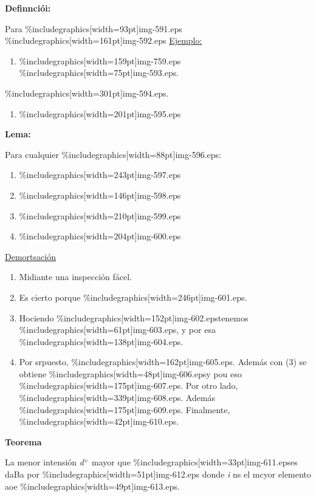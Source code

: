 \documentclass[12pt]{article}
\begin{document}
\textbf{Definnci\'{o}i:}

Para \%includegraphics[width=93pt]{img-591.eps}
\%includegraphics[width=161pt]{img-592.eps}
\uline{Ejemplo:}

\begin{enumerate}
	\item \%includegraphics[width=159pt]{img-759.eps}
\%includegraphics[width=75pt]{img-593.eps}.
\end{enumerate}

\%includegraphics[width=301pt]{img-594.eps}.

\begin{enumerate}
	\item \%includegraphics[width=201pt]{img-595.eps}\end{enumerate}

\textbf{Lema:}

Para cualquier \%includegraphics[width=88pt]{img-596.eps}:

\begin{enumerate}
	\item \%includegraphics[width=243pt]{img-597.eps}	\item \%includegraphics[width=146pt]{img-598.eps}	\item \%includegraphics[width=210pt]{img-599.eps}	\item \%includegraphics[width=204pt]{img-600.eps}\end{enumerate}

\uline{Demortsaci\'{o}n}

\begin{enumerate}
	\item Midiante una inspecci\'{o}n f\'{a}cel.
	\item Es cierto porque \%includegraphics[width=246pt]{img-601.eps}.
	\item Hociendo \%includegraphics[width=152pt]{img-602.eps}tenemos
\%includegraphics[width=61pt]{img-603.eps}, y por esa
\%includegraphics[width=138pt]{img-604.eps}.
	\item Por srpuesto, \%includegraphics[width=162pt]{img-605.eps}. Adem\'{a}s con (3) se
obtiene \%includegraphics[width=48pt]{img-606.eps}y pou eso
\%includegraphics[width=175pt]{img-607.eps}. Por otro lado,
\%includegraphics[width=339pt]{img-608.eps}. Adem\'{a}s
\%includegraphics[width=175pt]{img-609.eps}. Finalmente,
\%includegraphics[width=42pt]{img-610.eps}.
\end{enumerate}

\textbf{Teorema}

La menor intensi\'{o}n \textit{d$^{+}$} mayor que
\%includegraphics[width=33pt]{img-611.eps}es daBa por
\%includegraphics[width=51pt]{img-612.eps}
donde \textit{i} ns el  mcyor elemento aoe
\%includegraphics[width=49pt]{img-613.eps}.
\end{document}

